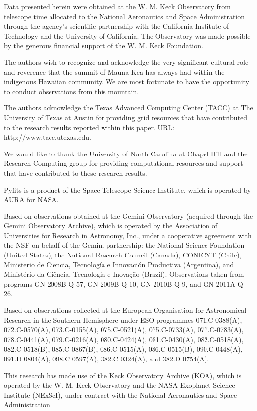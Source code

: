\documentclass[twocolumn]{aastex62}
\begin{document}
Data presented herein were obtained at the W. M. Keck Observatory from telescope time allocated to the National Aeronautics and Space Administration through the agency's scientific partnership with the California Institute of Technology and the University of California. The Observatory was made possible by the generous financial support of the W. M. Keck Foundation.

The authors wish to recognize and acknowledge the very significant cultural role and reverence that the summit of Mauna Kea has always had within the indigenous Hawaiian community. We are most fortunate to have the opportunity to conduct observations from this mountain.

The authors acknowledge the Texas Advanced Computing Center (TACC) at The University of Texas at Austin for providing grid resources that have contributed to the research results reported within this paper. URL: http://www.tacc.utexas.edu.

We would like to thank the University of North Carolina at Chapel Hill and the Research Computing group for providing computational resources and support that have contributed to these research results.

Pyfits is a product of the Space Telescope Science Institute, which is operated by AURA for NASA.

Based on observations obtained at the Gemini Observatory (acquired through the Gemini Observatory Archive), which is operated by the Association of Universities for Research in Astronomy, Inc., under a cooperative agreement with the NSF on behalf of the Gemini partnership: the National Science Foundation (United States), the National Research Council (Canada), CONICYT (Chile), Ministerio de Ciencia, Tecnolog\'{i}a e Innovaci\'{o}n Productiva (Argentina), and Minist\'{e}rio da Ci\^{e}ncia, Tecnologia e Inova\c{c}\~{a}o (Brazil). Observations taken from programs GN-2008B-Q-57, GN-2009B-Q-10, GN-2010B-Q-9, and GN-2011A-Q-26.

Based on observations collected at the European Organisation for Astronomical Research in the Southern Hemisphere under ESO programmes 071.C-0388(A), 072.C-0570(A), 073.C-0155(A), 075.C-0521(A), 075.C-0733(A), 077.C-0783(A), 078.C-0441(A), 079.C-0216(A), 080.C-0424(A), 081.C-0430(A), 082.C-0518(A), 082.C-0518(B), 085.C-0867(B), 086.C-0515(A), 086.C-0515(B), 090.C-0448(A), 091.D-0804(A), 098.C-0597(A), 382.C-0324(A), and 382.D-0754(A).

 This research has made use of the Keck Observatory Archive (KOA), which is operated by the W. M. Keck Observatory and the NASA Exoplanet Science Institute (NExScI), under contract with the National Aeronautics and Space Administration. 
\end{document}
